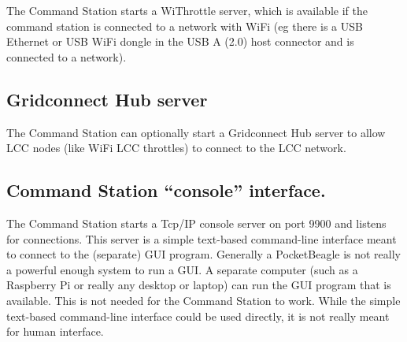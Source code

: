 The Command Station starts a WiThrottle server, which is available if the 
command station is connected to a network with WiFi (eg there is a USB 
Ethernet or USB WiFi dongle in the USB A (2.0) host connector and is connected 
to a network).

\subsection{Gridconnect Hub server}

The Command Station can optionally start a Gridconnect Hub server to allow LCC 
nodes (like WiFi LCC throttles) to connect to the LCC network.

\subsection{Command Station ``console'' interface.}

The Command Station starts a Tcp/IP console server on port 9900 and listens
for connections. This server is a simple text-based command-line interface
meant to connect to the (separate) GUI program. Generally a PocketBeagle is
not really a powerful enough system to run a GUI. A separate computer (such as
a Raspberry Pi or really any desktop or laptop) can run the GUI program that
is available. This is not needed for the Command Station to work. While the
simple text-based command-line interface could be used directly, it is not
really meant for human interface.

